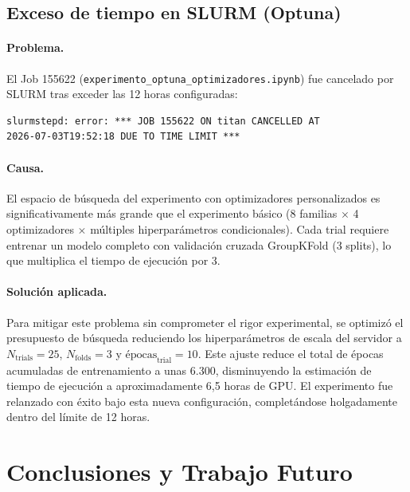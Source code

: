 \documentclass[12pt, a4paper]{article}
\newcommand{\code}[1]{\texttt{#1}}
\begin{document}
\subsection{Exceso de tiempo en SLURM (Optuna)}
\label{sec:problemas_slurm}

\paragraph{Problema.}
El Job 155622 (\code{experimento\_optuna\_optimizadores.ipynb}) fue cancelado por SLURM tras exceder las 12 horas configuradas:
\begin{verbatim}
slurmstepd: error: *** JOB 155622 ON titan CANCELLED AT
2026-07-03T19:52:18 DUE TO TIME LIMIT ***
\end{verbatim}

\paragraph{Causa.}
El espacio de búsqueda del experimento con optimizadores personalizados es significativamente más grande que el experimento básico (8 familias $\times$ 4 optimizadores $\times$ múltiples hiperparámetros condicionales). Cada trial requiere entrenar un modelo completo con validación cruzada GroupKFold (3 splits), lo que multiplica el tiempo de ejecución por 3.

\paragraph{Solución aplicada.}
Para mitigar este problema sin comprometer el rigor experimental, se optimizó el presupuesto de búsqueda reduciendo los hiperparámetros de escala del servidor a $N_{\text{trials}} = 25$, $N_{\text{folds}} = 3$ y $\text{épocas}_{\text{trial}} = 10$. Este ajuste reduce el total de épocas acumuladas de entrenamiento a unas 6.300, disminuyendo la estimación de tiempo de ejecución a aproximadamente 6,5 horas de GPU. El experimento fue relanzado con éxito bajo esta nueva configuración, completándose holgadamente dentro del límite de 12 horas.


\section{Conclusiones y Trabajo Futuro}
\label{sec:conclusiones}
\end{document}
